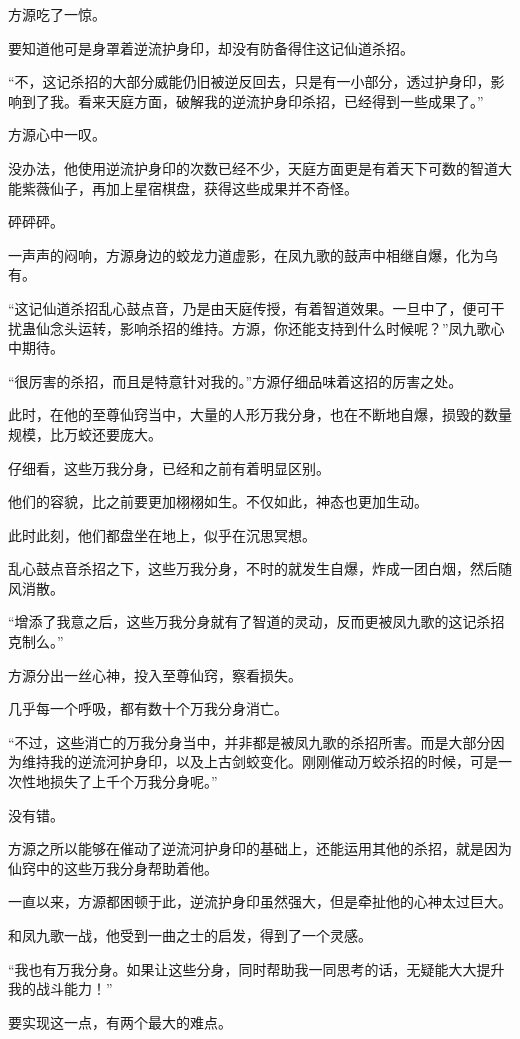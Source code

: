 \begin{this_body}
方源吃了一惊。

要知道他可是身罩着逆流护身印，却没有防备得住这记仙道杀招。

“不，这记杀招的大部分威能仍旧被逆反回去，只是有一小部分，透过护身印，影响到了我。看来天庭方面，破解我的逆流护身印杀招，已经得到一些成果了。”

方源心中一叹。

没办法，他使用逆流护身印的次数已经不少，天庭方面更是有着天下可数的智道大能紫薇仙子，再加上星宿棋盘，获得这些成果并不奇怪。

砰砰砰。

一声声的闷响，方源身边的蛟龙力道虚影，在凤九歌的鼓声中相继自爆，化为乌有。

“这记仙道杀招乱心鼓点音，乃是由天庭传授，有着智道效果。一旦中了，便可干扰蛊仙念头运转，影响杀招的维持。方源，你还能支持到什么时候呢？”凤九歌心中期待。

“很厉害的杀招，而且是特意针对我的。”方源仔细品味着这招的厉害之处。

此时，在他的至尊仙窍当中，大量的人形万我分身，也在不断地自爆，损毁的数量规模，比万蛟还要庞大。

仔细看，这些万我分身，已经和之前有着明显区别。

他们的容貌，比之前要更加栩栩如生。不仅如此，神态也更加生动。

此时此刻，他们都盘坐在地上，似乎在沉思冥想。

乱心鼓点音杀招之下，这些万我分身，不时的就发生自爆，炸成一团白烟，然后随风消散。

“增添了我意之后，这些万我分身就有了智道的灵动，反而更被凤九歌的这记杀招克制么。”

方源分出一丝心神，投入至尊仙窍，察看损失。

几乎每一个呼吸，都有数十个万我分身消亡。

“不过，这些消亡的万我分身当中，并非都是被凤九歌的杀招所害。而是大部分因为维持我的逆流河护身印，以及上古剑蛟变化。刚刚催动万蛟杀招的时候，可是一次性地损失了上千个万我分身呢。”

没有错。

方源之所以能够在催动了逆流河护身印的基础上，还能运用其他的杀招，就是因为仙窍中的这些万我分身帮助着他。

一直以来，方源都困顿于此，逆流护身印虽然强大，但是牵扯他的心神太过巨大。

和凤九歌一战，他受到一曲之士的启发，得到了一个灵感。

“我也有万我分身。如果让这些分身，同时帮助我一同思考的话，无疑能大大提升我的战斗能力！”

要实现这一点，有两个最大的难点。


\end{this_body}
